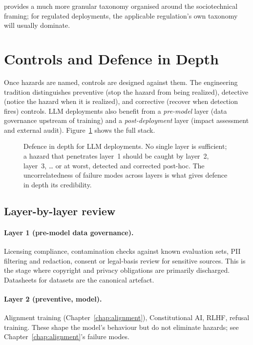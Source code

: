 \citet{weidinger2023sociotechnical} provides a much more
granular taxonomy organised around the sociotechnical
framing; for regulated deployments, the applicable regulation's
own taxonomy will usually dominate.

\section{Controls and Defence in Depth}

Once hazards are named, controls are designed against them. The
engineering tradition distinguishes preventive (stop the
hazard from being realized), detective (notice the hazard
when it is realized), and corrective (recover when detection
fires) controls. LLM deployments also benefit from a
\emph{pre-model} layer (data governance upstream of training)
and a \emph{post-deployment} layer (impact assessment and
external audit). Figure~\ref{fig:controls-layers} shows the full
stack.

\begin{figure}[ht]
  \centering
  
  \caption{Defence in depth for LLM deployments. No single layer is
  sufficient; a hazard that penetrates layer~1 should be caught
  by layer~2, layer~3, \dots{} or at worst, detected and
  corrected post-hoc. The uncorrelatedness of failure modes
  across layers is what gives defence in depth its credibility.}
  \label{fig:controls-layers}
\end{figure}

\subsection{Layer-by-layer review}

\paragraph{Layer 1 (pre-model data governance).} Licensing
compliance, contamination checks against known evaluation sets,
PII filtering and redaction, consent or legal-basis review for
sensitive sources. This is the stage where copyright and
privacy obligations are primarily discharged. Datasheets for
datasets \citep{gebru2021datasheets} are the canonical
artefact.

\paragraph{Layer 2 (preventive, model).} Alignment training
(Chapter~\ref{chap:alignment}), Constitutional AI, RLHF, refusal training. These
shape the model's behaviour but do not eliminate hazards; see
Chapter~\ref{chap:alignment}'s failure modes.

